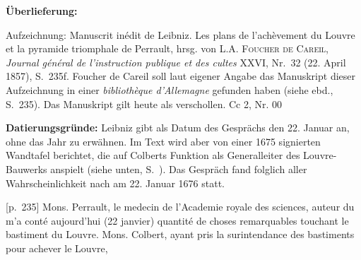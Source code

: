 \begin{ledgroupsized}[r]{120mm}%
\footnotesize%
\pstart%
\noindent%
\textbf{\"{U}berlieferung:}%
\pend%
\end{ledgroupsized}%
\begin{ledgroupsized}[r]{114mm}%
\footnotesize%
\pstart%
\parindent -6mm%
%
Aufzeichnung:
\cite{01152}\glqq Manuscrit inédit de Leibniz. Les plans de l'achèvement du Louvre et la pyramide triomphale de Perrault\grqq,
hrsg. von \textsc{L.A. Foucher de Careil},
\textit{Journal g\'{e}n\'{e}ral de l'instruction publique et des cultes} XXVI, Nr.~32 (22. April 1857), S.~235f.
Foucher de Careil soll laut eigener Angabe das Manuskript
dieser Aufzeichnung in einer \textit{bibliothèque d'Allemagne} gefunden haben
(siehe ebd., S.~235).
Das Manuskript gilt heute als verschollen.%
\newline%
Cc 2, Nr. 00%
\pend%
\end{ledgroupsized}%
%
\vspace*{5mm}%
\begin{ledgroup}%
\footnotesize%
\pstart%
\noindent%
\footnotesize{%
\textbf{Datierungsgr\"{u}nde:}
Leibniz gibt als Datum des Gespr\"{a}chs den 22. Januar an, ohne das Jahr zu erwähnen.
Im Text wird aber von einer 1675 signierten Wandtafel berichtet, die auf Colberts Funktion als Generalleiter des Louvre-Bauwerks anspielt
(siehe unten, S.~).
Das Gespr\"{a}ch fand folglich aller Wahrscheinlichkeit nach am 22. Januar 1676 statt.
}%
\pend%
\end{ledgroup}%
%
%
\vspace*{8mm}%
\count{}
\count{}
\count{}
\pstart%
\normalsize%
\noindent%
[p.~235] Mons. Perrault,\protect{}
le medecin de l'Academie royale des sciences,\protect{}
auteur du 
%
m'a cont\'{e} aujourd'hui (22 janvier) quantit\'{e} de choses remarquables touchant le bastiment du Louvre.\protect{}
Mons. Colbert,\protect{}
ayant pris la surintendance des bastiments pour achever le Louvre,\protect{}
